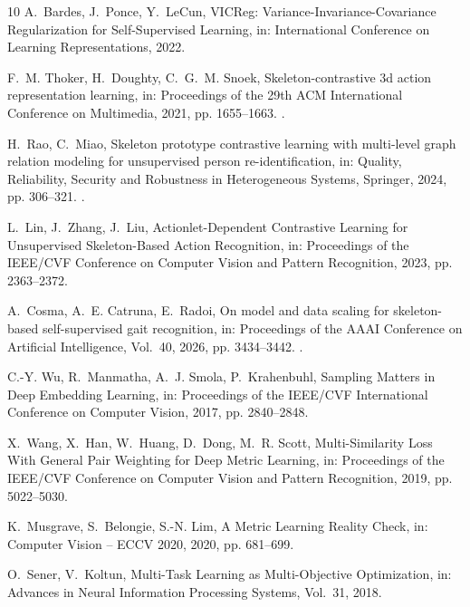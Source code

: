 \documentclass[review,12pt]{elsarticle}
\begin{document}
\begin{thebibliography}{10}
A.~Bardes, J.~Ponce, Y.~LeCun, {VICReg: Variance-Invariance-Covariance
  Regularization for Self-Supervised Learning}, in: {International Conference
  on Learning Representations}, 2022.

F.~M. Thoker, H.~Doughty, C.~G.~M. Snoek, Skeleton-contrastive 3d action
  representation learning, in: {Proceedings of the 29th ACM International
  Conference on Multimedia}, 2021, pp. 1655--1663.
\newblock \href {https://doi.org/10.1145/3474085.3475307}
  {}.

H.~Rao, C.~Miao, Skeleton prototype contrastive learning with multi-level graph
  relation modeling for unsupervised person re-identification, in: {Quality,
  Reliability, Security and Robustness in Heterogeneous Systems}, Springer,
  2024, pp. 306--321.
\newblock \href {https://doi.org/10.1007/978-3-031-65126-7_19}
  {}.

L.~Lin, J.~Zhang, J.~Liu, {Actionlet-Dependent Contrastive Learning for
  Unsupervised Skeleton-Based Action Recognition}, in: {Proceedings of the
  IEEE/CVF Conference on Computer Vision and Pattern Recognition}, 2023, pp.
  2363--2372.

A.~Cosma, A.~E. Catruna, E.~Radoi, On model and data scaling for skeleton-based
  self-supervised gait recognition, in: {Proceedings of the AAAI Conference on
  Artificial Intelligence}, Vol.~40, 2026, pp. 3434--3442.
\newblock \href {https://doi.org/10.1609/aaai.v40i5.37340}
  {}.

C.-Y. Wu, R.~Manmatha, A.~J. Smola, P.~Krahenbuhl, {Sampling Matters in Deep
  Embedding Learning}, in: {Proceedings of the IEEE/CVF International
  Conference on Computer Vision}, 2017, pp. 2840--2848.

X.~Wang, X.~Han, W.~Huang, D.~Dong, M.~R. Scott, {Multi-Similarity Loss With
  General Pair Weighting for Deep Metric Learning}, in: {Proceedings of the
  IEEE/CVF Conference on Computer Vision and Pattern Recognition}, 2019, pp.
  5022--5030.

K.~Musgrave, S.~Belongie, S.-N. Lim, {A Metric Learning Reality Check}, in:
  {Computer Vision -- ECCV 2020}, 2020, pp. 681--699.

O.~Sener, V.~Koltun, {Multi-Task Learning as Multi-Objective Optimization}, in:
  {Advances in Neural Information Processing Systems}, Vol.~31, 2018.


\end{thebibliography}
\end{document}
